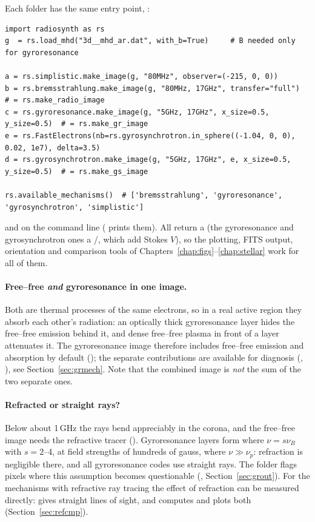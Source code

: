 Each folder has the same entry point, :
\begin{lstlisting}[style=pyex]
import radiosynth as rs
g  = rs.load_mhd("3d__mhd_ar.dat", with_b=True)     # B needed only for gyroresonance

a = rs.simplistic.make_image(g, "80MHz", observer=(-215, 0, 0))
b = rs.bremsstrahlung.make_image(g, "80MHz, 17GHz", transfer="full")   # = rs.make_radio_image
c = rs.gyroresonance.make_image(g, "5GHz, 17GHz", x_size=0.5, y_size=0.5)  # = rs.make_gr_image
e = rs.FastElectrons(nb=rs.gyrosynchrotron.in_sphere((-1.04, 0, 0), 0.02, 1e7), delta=3.5)
d = rs.gyrosynchrotron.make_image(g, "5GHz, 17GHz", e, x_size=0.5, y_size=0.5)  # = rs.make_gs_image

rs.available_mechanisms()  # ['bremsstrahlung', 'gyroresonance', 'gyrosynchrotron', 'simplistic']
\end{lstlisting}
and on the command line 
( prints them). All return a  (the
gyroresonance and gyrosynchrotron ones a /, which add Stokes $V$), so the plotting, FITS output,
orientation and comparison tools of Chapters~\ref{chap:figs}--\ref{chap:stellar} work
for all of them.

\paragraph{Free--free \emph{and} gyroresonance in one image.} Both are thermal processes
of the same electrons, so in a real active region they absorb each other's radiation:
an optically thick gyroresonance layer hides the free--free emission behind it, and dense
free--free plasma in front of a layer attenuates it. The gyroresonance image therefore
includes free--free emission and absorption by default (); the
separate contributions are available for diagnosis (, ), see
Section~\ref{sec:grmech}. Note that the combined image is \emph{not} the sum of the two
separate ones.

\paragraph{Refracted or straight rays?} Below about 1\,GHz the rays bend appreciably in
the corona, and the free--free image needs the refractive tracer
(). Gyroresonance layers form where $\nu=s\nu_B$ with $s=2$--4, at
field strengths of hundreds of gauss, where $\nu\gg\nu_p$: refraction is negligible
there, and all gyroresonance codes use straight rays. The  folder
flags pixels where this assumption becomes questionable (,
Section~\ref{sec:grout}). For the mechanisms with refractive ray tracing the effect of
refraction can be measured directly:  gives straight lines of
sight, and  computes and plots both
(Section~\ref{sec:refcmp}).

